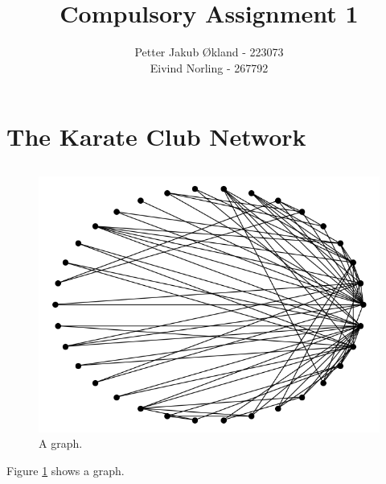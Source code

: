 \documentclass[11pt]{article}
\title{ Compulsory Assignment 1}
\author{ Petter Jakub Økland - 223073\\
Eivind Norling - 267792}
\begin{document}
\maketitle

\section{The Karate Club Network}
\subsection{}
\begin{figure}
  \includegraphics[width=\linewidth]{Figure_1.png}
  \caption{A graph.}
  \label{fig:graph model}
\end{figure}

Figure \ref{fig:graph model} shows a graph.
\end{document}
